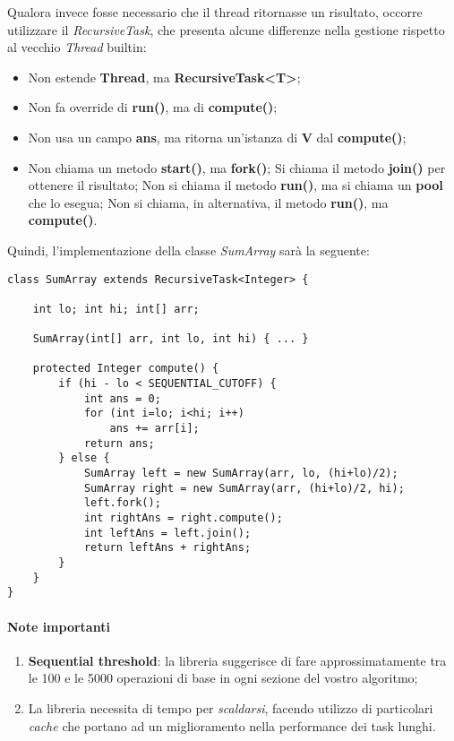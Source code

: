 Qualora invece fosse necessario che il thread ritornasse un risultato, occorre utilizzare il \textit{RecursiveTask}, che presenta alcune differenze nella gestione rispetto al vecchio \textit{Thread} builtin:
\begin{itemize}
	\item Non estende \textbf{Thread}, ma \textbf{RecursiveTask<T>};
	\item Non fa override di \textbf{run()}, ma di \textbf{compute()};
	\item Non usa un campo \textbf{ans}, ma ritorna un'istanza di \textbf{V} dal \textbf{compute()};
	\item Non chiama un metodo \textbf{start()}, ma \textbf{fork()};
	\textit{}Si chiama il metodo \textbf{join()} per ottenere il risultato;
	\textit{}Non si chiama il metodo \textbf{run()}, ma si chiama un \textbf{pool} che lo esegua;
	\textit{}Non si chiama, in alternativa, il metodo \textbf{run()}, ma \textbf{compute()}.
\end{itemize}

Quindi, l'implementazione della classe \textit{SumArray} sarà la seguente:
\begin{lstlisting}
class SumArray extends RecursiveTask<Integer> {

	int lo; int hi; int[] arr;

	SumArray(int[] arr, int lo, int hi) { ... }
	
	protected Integer compute() {
		if (hi - lo < SEQUENTIAL_CUTOFF) {
			int ans = 0;
			for (int i=lo; i<hi; i++)
				ans += arr[i];
			return ans;
		} else {
			SumArray left = new SumArray(arr, lo, (hi+lo)/2);
			SumArray right = new SumArray(arr, (hi+lo)/2, hi);
			left.fork();
			int rightAns = right.compute();
			int leftAns = left.join();
			return leftAns + rightAns;
		}
	}
}
\end{lstlisting}

\paragraph{Note importanti}
\begin{enumerate}
	\item \textbf{Sequential threshold}: la libreria suggerisce di fare approssimatamente tra le 100 e le 5000 operazioni di base in ogni sezione del vostro algoritmo;
	\item La libreria necessita di tempo per \textit{scaldarsi}, facendo utilizzo di particolari \textit{cache} che portano ad un miglioramento nella performance dei task lunghi.
\end{enumerate}

